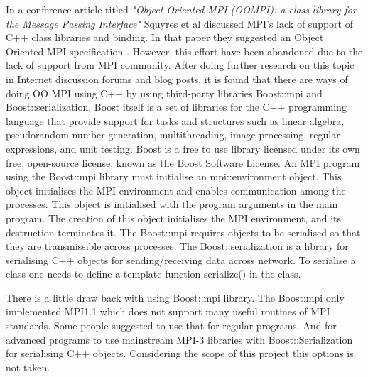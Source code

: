 In a conference article titled \textit{"Object Oriented MPI (OOMPI): a class library for the Message Passing Interface"} Squyres et al discussed MPI's lack of support of C++ class libraries and binding. In that paper they suggested an Object Oriented MPI specification \citep{squyresoompi}. However, this effort have been abandoned due to the lack of support from MPI community. After doing further research on this topic in Internet discussion forums and blog posts, it is found that there are ways of doing OO MPI using C++ by using third-party libraries Boost::mpi and Boost::serialization. Boost itself is a set of libraries for the C++ programming language that provide support for tasks and structures such as linear algebra, pseudorandom number generation, multithreading, image processing, regular expressions, and unit testing. Boost is a free to use library licensed under its own free, open-source license, known as the Boost Software License. An MPI program using the Boost::mpi library must initialise an mpi::environment object. This object initialises the MPI environment and enables communication among the processes. This object is initialised with the program arguments in the main program. The creation of this object initialises the MPI environment, and its destruction terminates it. The Boost::mpi requires objects to be serialised so that they are transmissible across processes. The Boost::serialization is a library for serialising C++ objects for sending/receiving data across network. To serialise a class one needs to define a template function serialize() in the class.

There is a little draw back with using Boost::mpi library. The Boost:mpi only implemented MPI1.1 which does not support many useful routines of MPI standards. Some people suggested to use that for regular programs. And for advanced programs to use mainstream MPI-3 libraries with Boost::Serialization for serialising C++ objects. Considering the scope of this project this options is not taken.